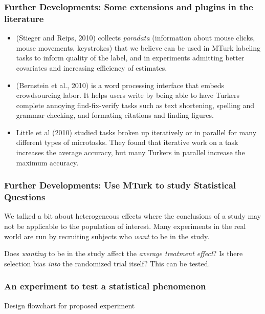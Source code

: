 \documentclass[slides]{beamer} %
\begin{document}
\begin{frame}\frametitle{Further Developments: Some extensions and plugins in the literature}

 \pause

\small

\begin{itemize}
\item {}  (Stieger and Reips, 2010) collects \textit{paradata} (information about mouse clicks, mouse movements, keystrokes) that we believe can be used in MTurk labeling tasks to inform quality of the label, and in experiments admitting better covariates and increasing efficiency of estimates.   \pause
\item  {} (Bernstein et al., 2010)  is a word processing interface that embeds crowdsourcing labor. It helps users write by being able to have Turkers complete annoying find-fix-verify tasks such as text shortening, spelling and grammar checking, and formating citations and finding figures.  \pause
\item Little et al (2010) studied tasks broken up iteratively or in parallel for many different types of microtasks. They found that iterative work on a task increases the average accuracy, but many Turkers in parallel increase the maximum accuracy.
\end{itemize}

\end{frame}

\begin{frame}\frametitle{Further Developments: Use MTurk to study Statistical Questions}
 \pause

We talked a bit about heterogeneous effects where the conclusions of a study may not be applicable to the population of interest. Many experiments in the real world are run by recruiting subjects who \textit{want} to be in the study.  \pause

\vspace{0.2cm}

Does \textit{wanting} to be in the study affect the \textit{average treatment effect}? Is there selection bias \textit{into} the randomized trial itself? This can be tested.

\end{frame}

\begin{frame}\frametitle{An experiment to test a statistical phenomenon}


\centering
Design flowchart for proposed experiment

\end{frame}
\end{document}
